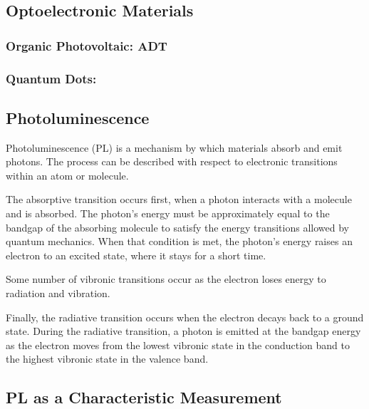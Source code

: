 \subsection{Optoelectronic Materials}
\subsubsection{Organic Photovoltaic: ADT}
\subsubsection{Quantum Dots: }

\subsection{Photoluminescence}
Photoluminescence (PL) is a mechanism by which materials absorb and emit photons. The process can be described with respect to electronic transitions within an atom or molecule.

The absorptive transition occurs first, when a photon interacts with a molecule and is absorbed. The photon's energy must be approximately equal to the bandgap of the absorbing molecule to satisfy the energy transitions allowed by quantum mechanics. When that condition is met, the photon's energy raises an electron to an excited state, where it stays for a short time.

Some number of vibronic transitions occur as the electron loses energy to radiation and vibration. 

Finally, the radiative transition occurs when the electron decays back to a ground state. During the radiative transition, a photon is emitted at the bandgap energy as the electron moves from the lowest vibronic state in the conduction band to the highest vibronic state in the valence band. 

\subsection{PL as a Characteristic Measurement}
